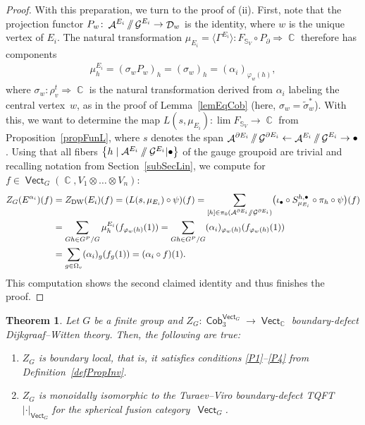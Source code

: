 \documentclass[10pt,a4paper]{amsart}
\DeclareMathOperator{\vect}{\mathsf{Vect}}
\DeclareMathOperator{\C}{\mathbb{C}}
\DeclareMathOperator{\Cob}{\mathsf{Cob}}
\DeclareMathOperator{\cala}{\mathcal{A}}
\DeclareMathOperator{\cald}{\mathcal{D}}
\DeclareMathOperator{\calg}{\mathcal{G}}
\newcommand{\sslash}{\mathbin{/\mkern-6mu/}}
\numberwithin{equation}{section}
\newtheorem{Theorem}{Theorem}[section]
\theoremstyle{definition}
\begin{document}
\begin{proof}
 With this preparation, we turn to the proof of (ii). First, note that the projection functor $P_w\colon \cala^{E_i} \sslash \calg^{E_i} \rightarrow \cald_w$ is the identity, where $w$ is the unique vertex of $E_i$. The natural transformation $\mu_{E_i} = \bigl\langle \Gamma^{E_i}\bigr\rangle\colon F_{\mathbb{S}_V} \circ P_{\partial} \Rightarrow \C$ therefore has components
 \begin{align*}
 \mu_h^{E_i} = (\sigma_wP_w)_h = (\sigma_w)_h = (\alpha_i)_{\varphi_w(h)},
 \end{align*}
 where $\sigma_w\colon \rho_v^t \Rightarrow \C$ is the natural transformation derived from $\alpha_i$ labeling the central vertex~$w$, as in the proof of Lemma~\ref{lemEqCob} (here, $\sigma_w = \widetilde{\sigma}_w^*$). With this, we want to determine the map $L(s, \mu_{E_i})\colon \lim F_{\mathbb{S}_V} \rightarrow \C$ from Proposition~\ref{propFunL}, where $s$ denotes the span $\cala^{\partial E_i} \sslash \calg^{\partial E_i} \leftarrow \cala^{E_i} \sslash \calg^{E_i} \rightarrow \bullet$. Using that all fibers $\bigl\{h \mid \mathcal{A}^{E_i}\sslash \mathcal{G}^{E_i}|\bullet\bigr\}$ of the gauge groupoid are trivial and recalling notation from Section~\ref{subSecLin}, we compute for $f \in \vect_G(\C, V_1 \otimes \dots \otimes V_n) $:
 \begin{align*}
 Z_G(E^{\alpha_i})(f) &= Z_{\rm DW}(E_i)(f) = (L(s, \mu_{E_i}) \circ \psi)(f) =\sum_{[h] \in \pi_0 (\mathcal{A}^{\partial E_i}\sslash \mathcal{G}^{\partial E_i} )}\bigl(\iota_{\bullet} \circ S_{\mu_{E_i}}^{h, \bullet} \circ \pi_h \circ \psi\bigr)(f) \\ &= \sum_{Gh \in G^P/G}\mu_h^{E_i}(f_{\varphi_w(h)}(1)) = \sum_{Gh \in G^P/G} (\alpha_i)_{\varphi_w(h)}(f_{\varphi_w(h)}(1)) \\
 &= \sum_{g \in \Omega_v} (\alpha_i)_g (f_g (1)) = (\alpha_i \circ f)(1).
 \end{align*}
 This computation shows the second claimed identity and thus finishes the proof.
\end{proof}

\begin{Theorem}
 \label{thmDW}
 Let $G$ be a finite group and $Z_G\colon \Cob_3^{\vect_G} \rightarrow \vect_{\C}$ boundary-defect Dijkgraaf--Witten theory. Then, the following are true:
 \begin{enumerate}[$(i)$]\itemsep=0pt
 \item $Z_G$ is boundary local, that is, it satisfies conditions {\rm \ref{P1}--\ref{P4}} from Definition~{\rm \ref{defPropInv}}.
 \item $Z_G$ is monoidally isomorphic to the Turaev--Viro boundary-defect TQFT $|\cdot|_{\vect_G}$ for the spherical fusion category~$\vect_G$.
 \end{enumerate}
\end{Theorem}
\end{document}
